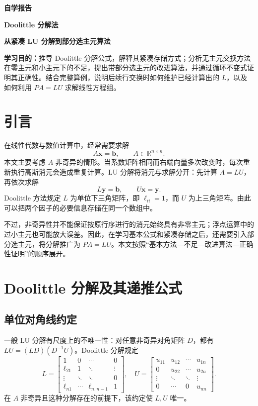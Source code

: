 \documentclass[UTF8,11pt,a4paper,fontset=fandol]{ctexart}
\newcommand{\R}{\mathbb{R}}
\newcommand{\mat}[1]{\begin{bmatrix}#1\end{bmatrix}}
\begin{document}
\hypersetup{pageanchor=false}
\begin{titlepage}
\centering
\vspace*{3.5cm}
{\Large\bfseries 自学报告\par}
\vspace{0.9cm}
{\huge\bfseries Doolittle 分解法\par}
\vspace{0.5cm}
{\Large\bfseries 从紧凑 LU 分解到部分选主元算法\par}
\vspace{1.8cm}
\begin{minipage}{0.84\textwidth}
\textbf{学习目的：}推导 Doolittle 分解公式，解释其紧凑存储方式；分析无主元交换方法在零主元和小主元下的不足，提出带部分选主元的改进算法，并通过循环不变式证明其正确性。结合完整算例，说明后续行交换时如何维护已经计算出的 $L$，以及如何利用 $PA=LU$ 求解线性方程组。
\end{minipage}
\vfill
\end{titlepage}
\hypersetup{pageanchor=true}
\tableofcontents
\clearpage
{}

\section{引言}
在线性代数与数值计算中，经常需要求解
\[
A\mathbf{x}=\mathbf{b},\qquad A\in\R^{n\times n}.
\]
本文主要考虑 $A$ 非奇异的情形。当系数矩阵相同而右端向量多次改变时，每次重新执行高斯消元会造成重复计算。LU 分解将消元与求解分开：先计算 $A=LU$，再依次求解
\[
L\mathbf{y}=\mathbf{b},\qquad U\mathbf{x}=\mathbf{y}.
\]
Doolittle 方法规定 $L$ 为单位下三角矩阵，即 $\ell_{ii}=1$，而 $U$ 为上三角矩阵。由此可以把两个因子的必要信息存储在同一个数组中。

不过，非奇异性并不能保证按原行序进行的消元始终具有非零主元；浮点运算中的过小主元也可能放大误差。因此，在学习基本公式和紧凑存储之后，还需要引入部分选主元，将分解推广为 $PA=LU$。本文按照“基本方法---不足---改进算法---正确性证明”的顺序展开。

\section{Doolittle 分解及其递推公式}
\subsection{单位对角线约定}
一般 LU 分解有尺度上的不唯一性：对任意非奇异对角矩阵 $D$，都有 $LU=(LD)(D^{-1}U)$。Doolittle 分解规定
\[
L=\mat{1&0&\cdots&0\\ \ell_{21}&1&\ddots&\vdots\\ \vdots&\ddots&\ddots&0\\ \ell_{n1}&\cdots&\ell_{n,n-1}&1},
\quad
U=\mat{u_{11}&u_{12}&\cdots&u_{1n}\\0&u_{22}&\cdots&u_{2n}\\\vdots&\ddots&\ddots&\vdots\\0&\cdots&0&u_{nn}}.
\]
在 $A$ 非奇异且这种分解存在的前提下，该约定使 $L,U$ 唯一。
\end{document}
